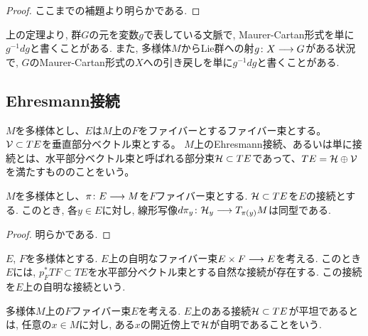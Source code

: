 \begin{proof}
ここまでの補題より明らかである.
\end{proof}

\begin{rem}
\label{rem:remark-on-notation-of-Maurer-Cartan-form}
上の定理より, 群$G$の元を変数$g$で表している文脈で, Maurer-Cartan形式を単に$g^{-1}dg$と書くことがある.
また, 多様体$M$からLie群への射$g \colon X \longrightarrow G$がある状況で, $G$のMaurer-Cartan形式の$X$への引き戻しを単に$g^{-1}dg$と書くことがある.
\end{rem}

\subsection{Ehresmann接続}

\begin{dfn}[接続]
$M$を多様体とし、$E$は$M$上の$F$をファイバーとするファイバー束とする。
$\mathcal{V} \subset TE$を垂直部分ベクトル束とする。
$M$上のEhresmann接続、あるいは単に接続とは、水平部分ベクトル束と呼ばれる部分束$\mathcal{H} \subset TE$であって、$TE = \mathcal{H} \oplus \mathcal{V}$を満たすもののことをいう。
\end{dfn}

\begin{lem}
$M$を多様体とし、$\pi \colon E \longrightarrow M$を$F$ファイバー束とする.
$\mathcal{H} \subset TE$を$E$の接続とする.
このとき, 各$y \in E$に対し, 線形写像$d\pi_y \colon \mathcal{H}_y \longrightarrow T_{\pi(y)}M$は同型である.
\end{lem}

\begin{proof}
明らかである.
\end{proof}

\begin{dfn}[自明な接続]
$E$, $F$を多様体とする.
$E$上の自明なファイバー束$E \times F \longrightarrow E$を考える.
このとき$E$には,
$p_F^* TF \subset TE$を水平部分ベクトル束とする自然な接続が存在する.
この接続を$E$上の自明な接続という.
\end{dfn}

\begin{dfn}[平坦接続]
多様体$M$上の$F$ファイバー束$E$を考える.
$E$上のある接続$\mathcal{H} \subset TE$が平坦であるとは, 任意の$x \in M$に対し, ある$x$の開近傍上で$\mathcal{H}$が自明であることをいう.
\end{dfn}

